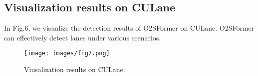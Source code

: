 \documentclass{bmvc2k}
\begin{document}
\subsection{Visualization results on CULane}
In Fig.6, we visualize the detection results of O2SFormer on CULane. 
O2SFormer can effectively detect lanes under various scenarios.
\begin{figure*}[!h]
   \begin{center}
   \texttt{[image: images/fig7.png]}
   \vspace{-0.5cm} 
   \end{center}
      \caption{Viusalization results on CULane.}
      \vspace{-0.1cm}
   \label{fig:short}
   \end{figure*}
\end{document}
